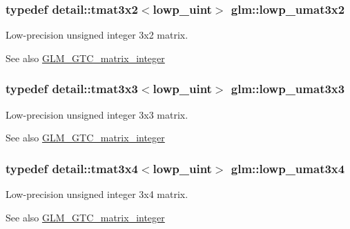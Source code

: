 \subsubsection[{lowp\+\_\+umat3x2}]{\setlength{\rightskip}{0pt plus 5cm}typedef detail\+::tmat3x2$<$lowp\+\_\+uint$>$ {\bf glm\+::lowp\+\_\+umat3x2}}\label{group__gtc__matrix__integer_gab06e14a13476419d7e8c2421fc7f60a1}
Low-\/precision unsigned integer 3x2 matrix. \begin{DoxySeeAlso}{See also}
\hyperlink{group__gtc__matrix__integer}{G\+L\+M\+\_\+\+G\+T\+C\+\_\+matrix\+\_\+integer} 
\end{DoxySeeAlso}
\hypertarget{group__gtc__matrix__integer_ga228d53c61d9ebac283e8f76754c6cff1}{}
\subsubsection[{lowp\+\_\+umat3x3}]{\setlength{\rightskip}{0pt plus 5cm}typedef detail\+::tmat3x3$<$lowp\+\_\+uint$>$ {\bf glm\+::lowp\+\_\+umat3x3}}\label{group__gtc__matrix__integer_ga228d53c61d9ebac283e8f76754c6cff1}
Low-\/precision unsigned integer 3x3 matrix. \begin{DoxySeeAlso}{See also}
\hyperlink{group__gtc__matrix__integer}{G\+L\+M\+\_\+\+G\+T\+C\+\_\+matrix\+\_\+integer} 
\end{DoxySeeAlso}
\hypertarget{group__gtc__matrix__integer_gace8e281261bb90e62c67444ec0c9e7e7}{}
\subsubsection[{lowp\+\_\+umat3x4}]{\setlength{\rightskip}{0pt plus 5cm}typedef detail\+::tmat3x4$<$lowp\+\_\+uint$>$ {\bf glm\+::lowp\+\_\+umat3x4}}\label{group__gtc__matrix__integer_gace8e281261bb90e62c67444ec0c9e7e7}
Low-\/precision unsigned integer 3x4 matrix. \begin{DoxySeeAlso}{See also}
\hyperlink{group__gtc__matrix__integer}{G\+L\+M\+\_\+\+G\+T\+C\+\_\+matrix\+\_\+integer} 
\end{DoxySeeAlso}
\hypertarget{group__gtc__matrix__integer_ga8c3fe5b40073668893a32bd07b7a64a1}{}
